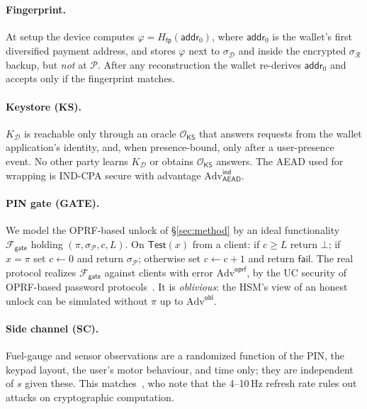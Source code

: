 \documentclass[11pt]{article}
\theoremstyle{remark}
\begin{document}
\paragraph{Fingerprint.} At setup the device computes $\varphi = H_{\mathsf{fp}}(\mathsf{addr}_0)$, where $\mathsf{addr}_0$ is the wallet's first diversified payment address, and stores $\varphi$ next to $\sigma_{\mathcal{D}}$ and inside the encrypted $\sigma_{\mathcal{R}}$ backup, but \emph{not} at $\mathcal{P}$. After any reconstruction the wallet re-derives $\mathsf{addr}_0$ and accepts only if the fingerprint matches.

\paragraph{Keystore (KS).} $K_{\mathcal{D}}$ is reachable only through an oracle $\mathcal{O}_{\mathsf{KS}}$ that answers requests from the wallet application's identity, and, when presence-bound, only after a user-presence event. No other party learns $K_{\mathcal{D}}$ or obtains $\mathcal{O}_{\mathsf{KS}}$ answers. The AEAD used for wrapping is IND-CPA secure with advantage $\mathrm{Adv}^{\mathsf{ind}}_{\mathsf{AEAD}}$.

\paragraph{PIN gate (GATE).} We model the OPRF-based unlock of §\ref{sec:method} by an ideal functionality $\mathcal{F}_{\mathsf{gate}}$ holding $(\pi, \sigma_{\mathcal{P}}, c, L)$. On $\mathsf{Test}(x)$ from a client: if $c \ge L$ return $\bot$; if $x = \pi$ set $c \leftarrow 0$ and return $\sigma_{\mathcal{P}}$; otherwise set $c \leftarrow c+1$ and return $\mathsf{fail}$. The real protocol realizes $\mathcal{F}_{\mathsf{gate}}$ against clients with error $\mathrm{Adv}^{\mathsf{oprf}}$, by the UC security of OPRF-based password protocols~\cite{opaque18}. It is \emph{oblivious}: the HSM's view of an honest unlock can be simulated without $\pi$ up to $\mathrm{Adv}^{\mathsf{obl}}$.

\paragraph{Side channel (SC).} Fuel-gauge and sensor observations are a randomized function of the PIN, the keypad layout, the user's motor behaviour, and time only; they are independent of $s$ given these. This matches~\cite{gn23}, who note that the 4--10\,Hz refresh rate rules out attacks on cryptographic computation.
\end{document}
